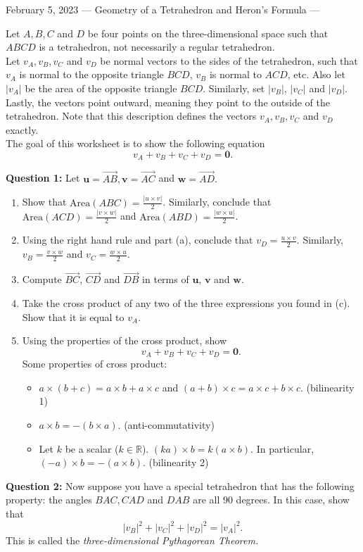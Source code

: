 February 5, 2023
---
Geometry of a Tetrahedron and Heron's Formula
---

Let $A,B,C$ and $D$ be four points on the three-dimensional space such that $ABCD$ is a tetrahedron, not necessarily a regular tetrahedron. \\

Let  $v_A, v_B, v_C$ and $v_D$ be normal vectors to the sides of the tetrahedron, such that $v_A$ is normal to the opposite triangle $BCD$, $v_B$ is normal to $ACD$, etc. Also let $|v_A|$ be the area of the opposite triangle $BCD$. Similarly, set $|v_B|$, $|v_C|$ and $|v_D|$. Lastly, the vectors point outward, meaning they point to the outside of the tetrahedron. Note that this description defines the vectors $v_A, v_B, v_C$ and $v_D$ exactly.\\

The goal of this worksheet is to show the following equation $$v_A+v_B+v_C+v_D = \textbf{0}.$$

\textbf{Question 1:} Let $\textbf{u} = \overset{\rightarrow}{AB}, \textbf{v} = \overset{\rightarrow}{AC}$ and $\textbf{w} = \overset{\rightarrow}{AD}.$ 
\begin{enumerate}[label=(\alph*)]
    \item Show that $\textrm{Area}(ABC) = \frac{|u\times v|}{2}$. Similarly, conclude that $\textrm{Area}(ACD) = \frac{|v\times w|}{2}$ and $\textrm{Area}(ABD) = \frac{|w\times u|}{2}$.
    \item Using the right hand rule and part (a), conclude that $v_D = \frac{u\times v}{2}$. Similarly, $v_B = \frac{v\times w}{2}$ and $v_C = \frac{w\times u}{2}$.
    \item Compute $\overset{\rightarrow}{BC}$, $\overset{\rightarrow}{CD}$ and $\overset{\rightarrow}{DB}$ in terms of $\textbf{u}$, $\textbf{v}$ and $\textbf{w}$.
    \item Take the cross product of any two of the three expressions you found in (c). Show that it is equal to $v_A.$
    \item Using the properties of the cross product, show $$v_A + v_B + v_C + v_D = \textbf{0}.$$ Some properties of cross product:
    \begin{itemize}
        \item $a\times (b+c) = a\times b + a\times c$ and $(a+b) \times c = a\times c + b\times c.$ (bilinearity 1) 
        \item $a\times b = - (b\times a).$ (anti-commutativity)
        \item Let $k$ be a scalar ($k\in \mathbb{R}$). $(ka) \times b = k(a\times b).$ In particular, $(-a)\times b = -(a\times b).$ (bilinearity 2)
    \end{itemize}
\end{enumerate}

\textbf{Question 2:} Now suppose you have a special tetrahedron that has the following property: the angles $BAC, CAD$ and $DAB$ are all 90 degrees. In this case, show that $$|v_B|^2+|v_C|^2+|v_D|^2 = |v_A|^2.$$ This is called the \textit{three-dimensional Pythagorean Theorem.}